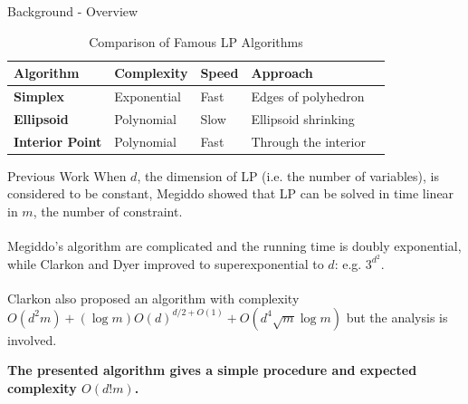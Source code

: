 \documentclass{beamer}
\newcommand{\supercite}[1]{\textsuperscript{\cite{#1}}}
\begin{document}
\begin{frame}{Background - Overview}

	\begin{table}[h]
		\centering
		\begin{tabular}{|l|l|l|l|l|}
			\hline
			\textbf{Algorithm}      & \textbf{Complexity} & \textbf{Speed} & \textbf{Approach}    \\ \hline
			\textbf{Simplex}        & Exponential         & Fast           & Edges of polyhedron  \\ \hline
			\textbf{Ellipsoid}      & Polynomial          & Slow           & Ellipsoid shrinking  \\ \hline
			\textbf{Interior Point} & Polynomial          & Fast           & Through the interior \\ \hline
		\end{tabular}
		\caption{Comparison of Famous LP Algorithms}
	\end{table}


\end{frame}
\begin{frame}{Previous Work}
	When $d$, the dimension of LP (i.e. the number of variables), is considered to be constant,
	Megiddo showed that LP can be solved in time linear in $m$, the number of constraint.

	\vspace{\baselineskip}

	Megiddo's algorithm\supercite{M2} are complicated and the running time is doubly exponential,
	while Clarkon and Dyer improved to superexponential to $d$: e.g. $3^{d^2}$.

	\vspace{\baselineskip}

	Clarkon also proposed an algorithm\supercite{C2} with complexity $O(d^2m) + (\log m)O(d)^{d/2 + O(1)} + O(d^4 \sqrt{m} \log m)$
	but the analysis is involved.

	\vspace{\baselineskip}

	\textbf{The presented algorithm gives a simple procedure and expected complexity $O(d!m)$.}
\end{frame}
\end{document}
